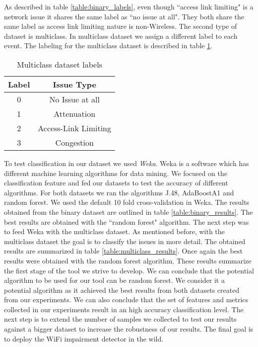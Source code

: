 As described in table \ref{table:binary_labels}, even though ``access link limiting" is a network issue it shares the same label as ``no issue at all". They both share the same label as access link limiting nature is non-Wireless.
The second type of dataset is multiclass. In multiclass dataset we assign a different label to each event. The labeling for the multiclass dataset is described in table \ref{table:multiclass_labels}.

\begin{table}[!h]
	\begin{center}
		\begin{tabular}{||c c||} 
			\hline
			Label & Issue Type\\ [0.5ex] 
			\hline\hline
			0 & No Issue at all \\ 
			\hline
			1 & Attenuation\\
			\hline
			2 & Access-Link Limiting \\
			\hline
			3 & Congestion \\[1ex] 
			\hline
		\end{tabular}
		\caption{Multiclass dataset labels}
		\label{table:multiclass_labels}
	\end{center}
\end{table}

To test classification in our dataset we used \emph{Weka}. Weka is a software which has different machine learning algorithms for data mining. We focused on the classification feature and fed our datasets to test the accuracy of different algorithms. For both datasets we ran the algorithms J.48, AdaBoostA1 and random forest. We used the default 10 fold cross-validation in Weka. The results obtained from the binary dataset are outlined in table \ref{table:binary_results}. The best results are obtained with the ``random forest" algorithm. The next step was to feed Weka with the multiclass dataset. As mentioned before, with the multiclass dataset the goal is to classify the issues in more detail. The obtained results are summarized in table \ref{table:multiclass_results}. Once again the best results were obtained with the random forest algorithm. 
These results summarize the first stage of the tool we strive to develop. We can conclude that the potential algorithm to be used for our tool can be random forest. We consider it a potential algorithm as it achieved the best results from both datasets created from our experiments. We can also conclude that the set of features and metrics collected in our experiments result in an high accuracy classification level. The next step is to extend the number of samples we collected to test our results against a bigger dataset to increase the robustness of our results. The final goal is to deploy the WiFi impairment detector in the wild.

\newpage


